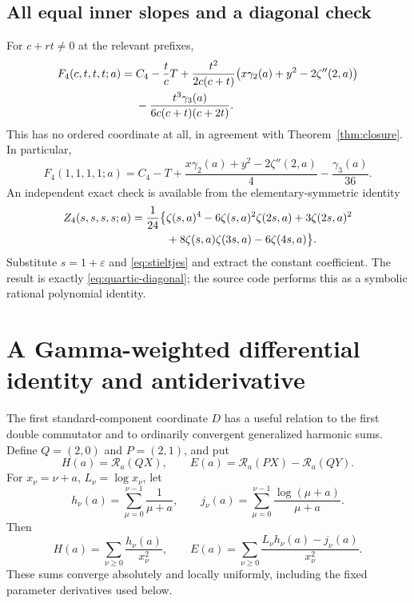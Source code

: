 \documentclass[11pt]{article}
\numberwithin{equation}{section}
\theoremstyle{definition}
\newcommand{\R}{\mathcal R}
\begin{document}
\subsection{All equal inner slopes and a diagonal check}
For $c+rt\ne0$ at the relevant prefixes,
\begin{align}\label{eq:quartic-closed}
 F_4(c,t,t,t;a)={}&C_4-\frac tcT
 +\frac{t^2}{2c(c+t)}
       \bigl(x\gamma_2(a)+y^2-2\zeta''(2,a)\bigr)\notag\\
 &-\frac{t^3\gamma_3(a)}{6c(c+t)(c+2t)}.
\end{align}
This has no ordered coordinate at all, in agreement with
Theorem~\ref{thm:closure}. In particular,
\begin{equation}\label{eq:quartic-diagonal}
 F_4(1,1,1,1;a)
 =C_4-T+\frac{x\gamma_2(a)+y^2-2\zeta''(2,a)}4
                        -\frac{\gamma_3(a)}{36}.
\end{equation}
An independent exact check is available from the elementary-symmetric
identity
\begin{align}\label{eq:newton4}
 Z_4(s,s,s,s;a)=\frac1{24}\bigl\{&\zeta(s,a)^4
 -6\zeta(s,a)^2\zeta(2s,a)+3\zeta(2s,a)^2\notag\\
 &+8\zeta(s,a)\zeta(3s,a)-6\zeta(4s,a)\bigr\}.
\end{align}
Substitute $s=1+\varepsilon$ and \eqref{eq:stieltjes} and extract the
constant coefficient. The result is exactly \eqref{eq:quartic-diagonal};
the source code performs this as a symbolic rational polynomial identity.

\section{A Gamma-weighted differential identity and antiderivative}
\label{sec:gamma-bridge}
The first standard-component coordinate $D$ has a useful relation to the
first double commutator and to ordinarily convergent generalized harmonic
sums. Define $Q=(2,0)$ and $P=(2,1)$, and put
\begin{equation}\label{eq:H-E-def}
 H(a)=\R_a(QX),\qquad
 E(a)=\R_a(PX)-\R_a(QY).
\end{equation}
For $x_\nu=\nu+a$, $L_\nu=\log x_\nu$, let
\begin{equation}\label{eq:HN-JN}
 h_\nu(a)=\sum_{\mu=0}^{\nu-1}\frac1{\mu+a},\qquad
 j_\nu(a)=\sum_{\mu=0}^{\nu-1}\frac{\log(\mu+a)}{\mu+a}.
\end{equation}
Then
\begin{equation}\label{eq:H-E-sums}
 H(a)=\sum_{\nu\ge0}\frac{h_\nu(a)}{x_\nu^2},\qquad
 E(a)=\sum_{\nu\ge0}\frac{L_\nu h_\nu(a)-j_\nu(a)}{x_\nu^2}.
\end{equation}
These sums converge absolutely and locally uniformly, including the
fixed parameter derivatives used below.
\end{document}
